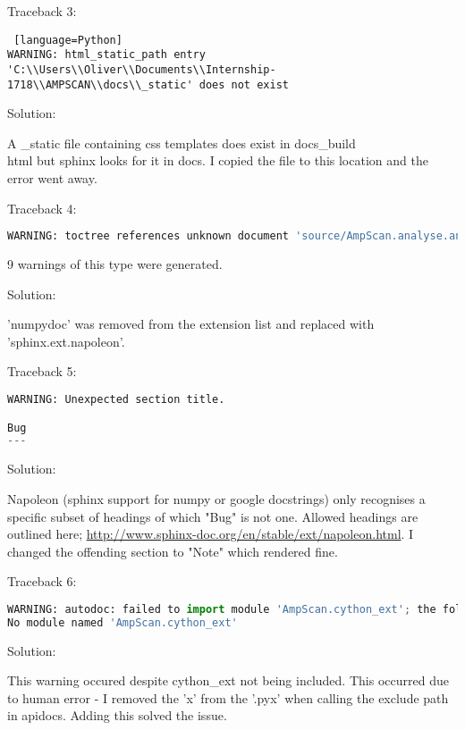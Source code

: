 \documentclass{article}
\begin{document}
Traceback 3:

\begin{lstlisting} [language=Python]
WARNING: html_static_path entry 'C:\\Users\\Oliver\\Documents\\Internship-1718\\AMPSCAN\\docs\\_static' does not exist
\end{lstlisting}

Solution:

A \_static file containing css templates does exist in docs\_build\\html but sphinx looks for it in docs. I copied the file to this location and the error went away.

Traceback 4:

\begin{lstlisting}[language=Python]
WARNING: toctree references unknown document 'source/AmpScan.analyse.analyseMixin.create_slices
\end{lstlisting}

9 warnings of this type were generated.

Solution:

'numpydoc' was removed from the extension list and replaced with 'sphinx.ext.napoleon'.

Traceback 5:

\begin{lstlisting}[language=Python]
WARNING: Unexpected section title.

Bug
---
\end{lstlisting}

Solution:

Napoleon (sphinx support for numpy or google docstrings) only recognises a specific subset of headings of which "Bug" is not one. Allowed headings are outlined here; \url{http://www.sphinx-doc.org/en/stable/ext/napoleon.html}. I changed the offending section to "Note" which rendered fine.

Traceback 6:

\begin{lstlisting}[language=Python]
WARNING: autodoc: failed to import module 'AmpScan.cython_ext'; the following exception was raised:
No module named 'AmpScan.cython_ext'
\end{lstlisting}

Solution:

This warning occured despite cython\_ext not being included. This occurred due to human error - I removed the 'x' from the '.pyx' when calling the exclude path in apidocs. Adding this solved the issue.
\end{document}
